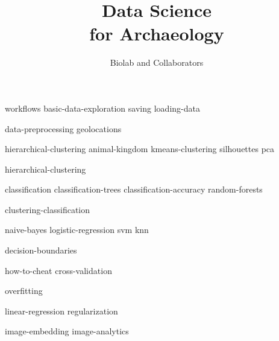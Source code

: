 \documentclass[symmetric, justified, a4paper]{tufte-book}
\title{Data Science \protect\\ for Archaeology}
\author[Biolab and Collaborators]{Biolab and Collaborators}
\begin{document}
\frontmatter

\maketitle



\tableofcontents

\mainmatter


{workflows}
{basic-data-exploration}
{saving}
{loading-data}

{data-preprocessing}
{geolocations}


{hierarchical-clustering}
{animal-kingdom}
{kmeans-clustering}
{silhouettes}
{pca}

{hierarchical-clustering}

{classification}
{classification-trees}
{classification-accuracy}
{random-forests}

{clustering-classification}

{naive-bayes}
{logistic-regression}
{svm}
{knn}

{decision-boundaries}

{how-to-cheat}
{cross-validation}

{overfitting}


{linear-regression}
{regularization}


{image-embedding}
{image-analytics}

\backmatter



\end{document}
